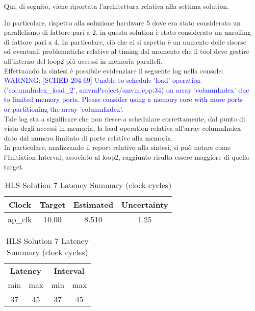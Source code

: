 Qui, di seguito, viene riportata l'architettura relativa alla settima solution.



In particolare, rispetto alla soluzione hardware 5 dove era stato considerato un parallelismo di fattore pari a 2, in questa solution è stato considerato un unrolling di fattore pari a 4. In particolare, ciò che ci si aspetta è un aumento delle risorse ed eventuali problematiche relative al timing dal momento che il tool deve gestire all'interno del loop2 più accessi in memoria paralleli.
\\
Effettuando la sintesi è possibile evidenziare il seguente log nella console:
\\
\textcolor{blue}{WARNING: [SCHED 204-69] Unable to schedule 'load' operation ('columnIndex\_load\_2', smvmProject/smvm.cpp:34) on array 'columnIndex' due to limited memory ports. Please consider using a memory core with more ports or partitioning the array 'columnIndex'.}
\\
Tale log sta a significare che non riesce a schedulare correttamente, dal punto di vista degli accessi in memoria, la load operation relativa all'array columnIndex dato dal numero limitato di porte relative alla memoria.
\\
In particolare, analizzando il report relativo alla sintesi, si può notare come l'Initiation Interval, associato al loop2, raggiunto risulta essere maggiore di quello target.
\\

\begin{table}[H]
	\centering
	\begin{minipage}[t]{0.45\linewidth}
		\centering
		\begin{tabular}{|c|c|c|c|}
			\hline
			\textbf{Clock} & \textbf{Target} & \textbf{Estimated} & \textbf{Uncertainty} \\
			\hline
			ap\_clk & 10.00 & 8.510 & 1.25 \\
			\hline
		\end{tabular}
		\caption{HLS Solution 7 Timing Summary (ns)}
		\label{tab:hls-solution-7-timing-summary}
	\end{minipage}
	\hfill
	\begin{minipage}[t]{0.45\linewidth}
		\centering
		\begin{tabular}{|c|c|c|c|}
			\hline
			\multicolumn{2}{|c|}{\textbf{Latency}} & \multicolumn{2}{|c|}{\textbf{Interval}} \\
			min & max & min & max \\
			\hline
			37 & 45 & 37 & 45 \\
			\hline
		\end{tabular}
		\caption{HLS Solution 7 Latency Summary (clock cycles)}
		\label{tab:hls-solution-7-latency-summary}
	\end{minipage}
\end{table}

